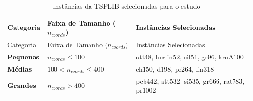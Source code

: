 \begin{longtable}[]{@{}
    >{\raggedright\arraybackslash}p{}
    >{\centering\arraybackslash}p{}
    >{\raggedright\arraybackslash}p{}@{}}
  \caption{Instâncias da TSPLIB selecionadas para o estudo
    \label{tbl:selected-instances}}\tabularnewline
  \toprule\noalign{}
  \begin{minipage}[b]{\linewidth}\raggedright
    Categoria
  \end{minipage} & \begin{minipage}[b]{\linewidth}\centering
                     Faixa de Tamanho (\(n_{coords}\))
                   \end{minipage} & \begin{minipage}[b]{\linewidth}\raggedright
                                      Instâncias Selecionadas
                                    \end{minipage}                                            \\
  \midrule\noalign{}
  \endfirsthead
  \toprule\noalign{}
  \begin{minipage}[b]{\linewidth}\raggedright
    Categoria
  \end{minipage} & \begin{minipage}[b]{\linewidth}\centering
                     Faixa de Tamanho (\(n_{coords}\))
                   \end{minipage} & \begin{minipage}[b]{\linewidth}\raggedright
                                      Instâncias Selecionadas
                                    \end{minipage}                                            \\
  \midrule\noalign{}
  \endhead
  \bottomrule\noalign{}
  \endlastfoot
  \textbf{Pequenas}                           & \(n_{coords} \le 100\)                    & att48, berlin52, eil51, gr96,
  kroA100                                                                                                                 \\
  \textbf{Médias}                             & \(100 < n_{coords} \le 400\)              & ch150, d198, pr264,
  lin318                                                                                                                  \\
  \textbf{Grandes}                            & \(n_{coords} > 400\)                      & pcb442, att532, si535, gr666,
  rat783, pr1002                                                                                                          \\
\end{longtable}

